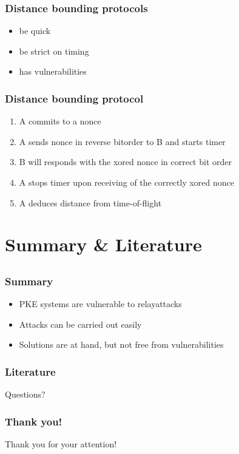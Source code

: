 \documentclass[12pt]{beamer}
\begin{document}
	\begin{frame}
		\frametitle{Distance bounding protocols}
			\begin{itemize}
				\item be quick
				\item be strict on timing
				\item has vulnerabilities
			\end{itemize}
	\end{frame}

	\begin{frame}
		\frametitle{Distance bounding protocol}
			\begin{enumerate}
				\item A commits to a nonce
				\item A sends nonce in reverse bitorder to B and starts timer
				\item B will responds with the xored nonce in correct bit order
				\item A stops timer upon receiving of the correctly xored nonce
				\item A deduces distance from time-of-flight
			\end{enumerate}
	\end{frame}

\section{Summary \& Literature}
\subsection*{}
	\begin{frame}
		\frametitle{Summary}
			\begin{itemize}
				\item PKE systems are vulnerable to relayattacks 
				\item Attacks can be carried out easily
				\item Solutions are at hand, but not free from vulnerabilities
			\end{itemize}
	\end{frame}
	\begin{frame}
	\frametitle{Literature}
	\tiny
	\nocite{*}
		\def\newblock{}
		
		
	\end{frame}
	
	\begin{frame}
		\begin{center}
			Questions?
		\end{center}
	\end{frame}	

	\begin{frame}
		\frametitle{Thank you!}
		\begin{center}
			Thank you for your attention!
		\end{center}
	\end{frame}	
\end{document}

